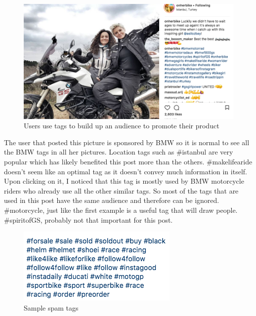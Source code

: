 \documentclass[10pt,letterpaper,bibliography=totoc]{scrartcl}
\begin{document}
\begin{figure}[h!]
\centering
\label{fig:insta-tag2}
\includegraphics[scale=.5]{insta-tag2.png}
\caption{Users use tags to build up an audience to promote their product}
\end{figure}

The user that posted this picture is sponsored by BMW so it is normal to see all the BMW tags in all her pictures. Location tags such as \#istanbul are very popular which has likely benefited this post more than the others. \#makelifearide doesn't seem like an optimal tag as it doesn't convey much information in itself. Upon clicking on it, I noticed that this tag is mostly used by BMW motorcycle riders who already use all the other similar tags. So most of the tags that are used in this post have the same audience and therefore can be ignored. \#motorcycle, just like the first example is a useful tag that will draw people. \#spiritofGS, probably not that important for this post.

\begin{figure}[h!]
\centering
\label{fig:insta-spam}
\includegraphics[scale=.5]{insta-spam.png}
\caption{Sample spam tags}
\end{figure}
\end{document}
